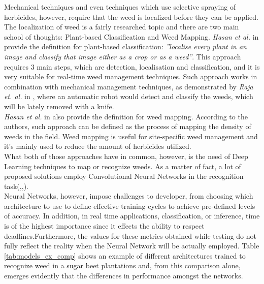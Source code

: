Mechanical techniques and even techniques which use selective spraying of herbicides, however, require that the weed is localized before they can be applied. The localization of weed is a fairly researched topic and there are two main school of thoughts: Plant-based Classification and Weed Mapping. 
\textit{Hasan et al.} in \cite{hasan_survey_2021} provide the definition for plant-based classification: \textit{''localise every plant in an image and classify that image either as a crop or as a weed''}. This approach requires 3 main steps, which are detection, localisation and classification, and it is very suitable for real-time weed management techniques. \cite{hasan_survey_2021} 
Such approach works in combination with mechanical management techniques, as demonstrated by \textit{Raja et. al.} in \cite{raja_real-time_2020}, where an automatic robot would detect and classify the weeds, which will be lately removed with a knife.\\
\textit{Hasan et al.} in \cite{hasan_survey_2021} also provide the definition for weed mapping. According to the authors, such approach can be defined as the process of mapping the density of weeds in the field.
Weed mapping is useful for site-specific weed management and it’s mainly used to reduce the amount of herbicides utilized. \cite{hasan_survey_2021} \\
What both of those approaches have in common, however, is the need of Deep Learning techniques to map or recognize weeds. As a matter of fact, a lot of proposed solutions employ Convolutional Neural Networks in the recognition task(\cite{gao_deep_2020},\cite{suh_transfer_2018},\cite{ramirez_deep_2020}).\\
Neural Networks, however, impose challenges to developer, from choosing which architecture to use to define effective training cycles to achieve pre-defined levels of accuracy. In addition, in real time applications, classification, or inference, time is of the highest importance since it effects the ability to respect deadlines.Furthermore, the values for these metrics obtained while testing do not fully reflect the reality when the Neural Network will be actually employed. Table \ref{tab:models_ex_comp} shows an example of different architectures trained to recognize weed in a sugar beet plantations and, from this comparison alone, emerges evidently that the differences in performance amongst the networks.\\ 
